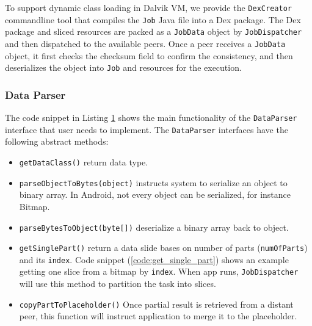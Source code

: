 \documentclass[conference]{IEEEtran}
\begin{document}
To support dynamic class loading in Dalvik VM, we provide the \texttt{DexCreator} commandline tool that compiles the \texttt{Job} Java file into a Dex package. The Dex package and sliced resources are packed as a \texttt{JobData} object by \texttt{JobDispatcher} and then dispatched to the available peers. Once a peer receives a \texttt{JobData} object, it first checks the checksum field to confirm the consistency, and then deserializes the object into \texttt{Job} and resources for the execution.

\begin{figure}
\noindent {}	
\noindent {}	
\label{code:job_def}
\end{figure}


\subsubsection{Data Parser}
The code snippet in Listing \ref{code:job_def} shows the main functionality of the \texttt{DataParser} interface that user needs to implement. The \texttt{DataParser} interfaces have the following abstract methods:
\begin{itemize}
	\item \texttt{getDataClass()} return data type.
	\item \texttt{parseObjectToBytes(object)} instructs system to serialize an object to binary array. In Android, not every object can be serialized, for instance Bitmap.  
	\item \texttt{parseBytesToObject(byte[])} deserialize a binary array back to object.
	\item \texttt{getSinglePart()} return a data slide bases on number of parts (\texttt{numOfParts}) and its \texttt{index}. Code snippet (\ref{code:get_single_part}) shows an example getting one slice from a bitmap by \texttt{index}. When app runs, \texttt{JobDispatcher} will use this method to partition the task into slices.
	\item \texttt{copyPartToPlaceholder()} Once partial result is retrieved from a distant peer, this function will instruct application to merge it to the placeholder.
\end{itemize}
\end{document}
